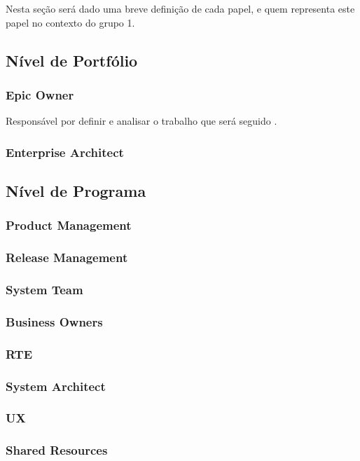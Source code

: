 Nesta seção será dado uma breve definição de cada papel, e quem representa este papel no contexto do grupo 1.

\subsection{Nível de Portfólio}
\subsubsection{Epic Owner}
Responsável por definir e analisar o trabalho que será seguido \cite{safe007}.

\subsubsection{Enterprise Architect}


\subsection{Nível de Programa}

\subsubsection{Product Management}
\subsubsection{Release Management}
\subsubsection{System Team}
\subsubsection{Business Owners}
\subsubsection{RTE}
\subsubsection{System Architect}
\subsubsection{UX}
\subsubsection{Shared Resources}

